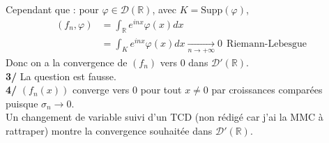 \documentclass[a4paper,12pt]{article}
\begin{document}
Cependant que : pour $\varphi \in \mathcal{D}(\mathbb{R})$, avec $K = \text{Supp}(\varphi)$, 
\begin{align*}
(f_n, \varphi) & = \int_{\mathbb{R}} e^{inx} \varphi(x) dx \\
	& \boxed{= \int_{K} e^{inx} \varphi(x) dx \underset{n \to + \infty}{\longrightarrow} 0 \ \ \text{Riemann-Lebesgue}}
\end{align*}
Donc on a la convergence de $(f_n)$ vers $0$ dans $\mathcal{D}'(\mathbb{R})$. \\

\textbf{3/} La question est fausse. \\

\textbf{4/} $(f_n(x))$ converge vers $0$ pour tout $x \neq 0$ par croissances comparées puisque $\sigma_n \longrightarrow 0$. \\

Un changement de variable suivi d'un TCD (non rédigé car j'ai la MMC à rattraper) montre la convergence souhaitée dans $\mathcal{D}'(\mathbb{R})$.
\end{document}
